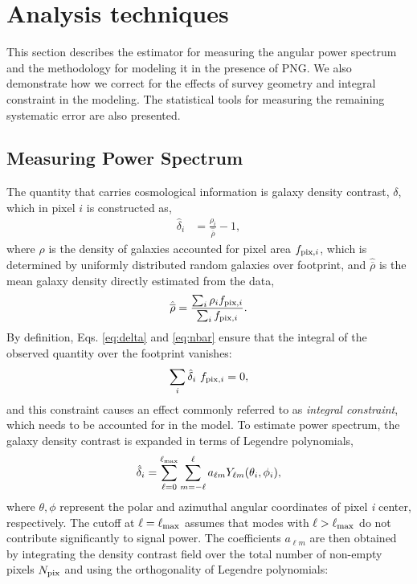 \section{Analysis techniques}
\label{sec:method}
This section describes the estimator for measuring the angular power spectrum and the methodology for modeling it in the presence of PNG. We also demonstrate how we correct for the effects of survey geometry and integral constraint in the modeling. The statistical tools for measuring the remaining systematic error are also presented. 
 
 
 \subsection{Measuring Power Spectrum}
The quantity that carries cosmological information is galaxy density contrast, $\delta$, which in pixel $i$ is constructed as,
\begin{align}\label{eq:delta}
    \hat{\delta}_{i} &= \frac{\rho_{i}}{\hat{\overline{\rho}}} - 1 ,
\end{align}
where $\rho$ is the density of galaxies accounted for pixel area $f_{{\rm pix},i}$, which is determined by uniformly distributed random galaxies over footprint, and $\hat{\overline{\rho}}$ is the mean galaxy density directly estimated from the data,
\begin{equation}\label{eq:nbar}
\hat{\overline{\rho}} = \frac{\sum_{i}\rho_{i}f_{{\rm pix},i}}{\sum_{i}f_{{\rm pix},i}}.
\end{equation}
By definition, Eqs. \ref{eq:delta} and \ref{eq:nbar} ensure that the integral of the observed quantity over the footprint vanishes:
\begin{align}\label{eq:ic}
    \sum_{i} \hat{\delta}_{i}~f_{{\rm pix},i} = 0,
\end{align}
and this constraint causes an effect commonly referred to as \textit{integral constraint}, which needs to be accounted for in the model. To estimate power spectrum, the galaxy density contrast is expanded in terms of Legendre polynomials,
\begin{equation}
        \hat{\delta}_{i} = \sum_{\ell=0}^{\ell_{{\rm max}}}\sum_{m=-\ell}^{\ell} a_{\ell m} Y_{\ell m}(\theta_{i}, \phi_{i}),
\end{equation}
where $\theta, \phi$ represent the polar and azimuthal angular coordinates of pixel \textit{i} center, respectively. The cutoff at $\ell=\ell_{{\rm max}}$ assumes that modes with $\ell>\ell_{{\rm max}}$ do not contribute significantly to signal power. The  coefficients $a_{\ell m}$ are then obtained by integrating the density contrast field over the total number of non-empty pixels $N_{{\rm pix}}$ and using the orthogonality of Legendre polynomials:
